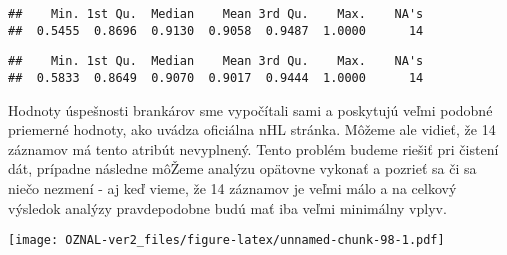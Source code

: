 \documentclass[
]{article}
\newenvironment{Shaded}{\begin{snugshade}}{\end{snugshade}}
\newcommand{\AttributeTok}[1]{\textcolor[rgb]{0.77,0.63,0.00}{#1}}
\newcommand{\DecValTok}[1]{\textcolor[rgb]{0.00,0.00,0.81}{#1}}
\newcommand{\FunctionTok}[1]{\textcolor[rgb]{0.00,0.00,0.00}{#1}}
\newcommand{\NormalTok}[1]{#1}
\newcommand{\SpecialCharTok}[1]{\textcolor[rgb]{0.00,0.00,0.00}{#1}}
\newcommand{\StringTok}[1]{\textcolor[rgb]{0.31,0.60,0.02}{#1}}
\begin{document}
\begin{verbatim}
##    Min. 1st Qu.  Median    Mean 3rd Qu.    Max.    NA's 
##  0.5455  0.8696  0.9130  0.9058  0.9487  1.0000      14
\end{verbatim}

\begin{Shaded}
\end{Shaded}

\begin{verbatim}
##    Min. 1st Qu.  Median    Mean 3rd Qu.    Max.    NA's 
##  0.5833  0.8649  0.9070  0.9017  0.9444  1.0000      14
\end{verbatim}

Hodnoty úspešnosti brankárov sme vypočítali sami a poskytujú veľmi
podobné priemerné hodnoty, ako uvádza oficiálna nHL stránka. Môžeme ale
vidieť, že 14 záznamov má tento atribút nevyplnený. Tento problém budeme
riešiť pri čistení dát, prípadne následne môŽeme analýzu opätovne
vykonať a pozrieť sa či sa niečo nezmení - aj keď vieme, že 14 záznamov
je veľmi málo a na celkový výsledok analýzy pravdepodobne budú mať iba
veľmi minimálny vplyv.

\begin{Shaded}
\end{Shaded}

\texttt{[image: OZNAL-ver2\_files/figure-latex/unnamed-chunk-98-1.pdf]}
\end{document}
